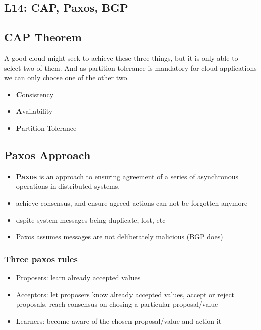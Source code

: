 \documentclass[a4paper]{article}
\begin{document}
\begin{multicols}{3}
\section{L14: CAP, Paxos, BGP}

\subsection{CAP Theorem}
A good cloud might seek to achieve these three things, but it is only able to select two of them.
And as partition tolerance is mandatory for cloud applications we can only choose one of the other two.

\begin{itemize}
    \item \textbf{C}onsistency
    \item \textbf{A}vailability
    \item \textbf{P}artition Tolerance
\end{itemize}

\subsection{Paxos Approach}
\begin{itemize}
    \item \textbf{Paxos} is an approach to ensuring agreement of a series of asynchronous operations in distributed systems.
    \item achieve consensus, and ensure agreed actions can not be forgotten anymore
    \item dspite system messages being duplicate, lost, etc
    \item Paxos assumes messages are not deliberately malicious (BGP does)
\end{itemize}

\subsubsection{Three paxos rules}
\begin{itemize}
    \item Proposers: learn already accepted values
    \item Acceptors: let proposers know already accepted values, accept or reject proposals, reach consensus on chosing a particular proposal/value
    \item Learners: become aware of the chosen proposal/value and action it
\end{itemize}


\end{multicols}
\end{document}
